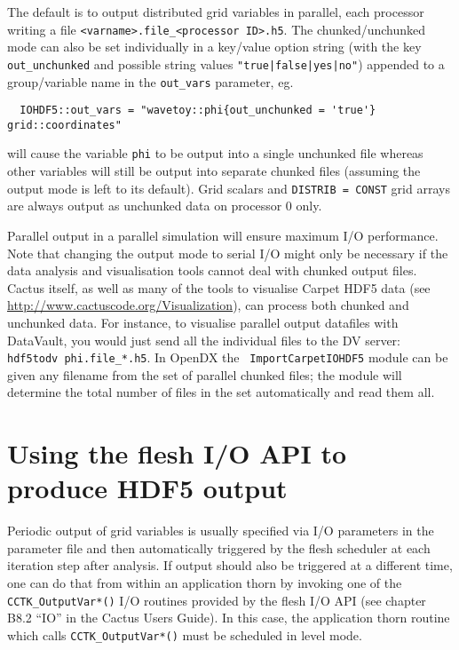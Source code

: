 \documentclass{article}
\begin{document}
The default is to output distributed grid variables in parallel, each processor
writing a file
{\tt \textless varname\textgreater.file\_\textless processor ID\textgreater.h5}.
The chunked/unchunked mode can also be set individually in a key/value
option string (with the key {\tt out\_unchunked} and possible string values
{\tt "true|false|yes|no"}) appended to a group/variable name in the
{\tt out\_vars} parameter, eg.
\begin{verbatim}
  IOHDF5::out_vars = "wavetoy::phi{out_unchunked = 'true'}  grid::coordinates"
\end{verbatim}
will cause the variable {\tt phi} to be output into a single unchunked file
whereas other variables will still be output into separate chunked files
(assuming the output mode is left to its default).
Grid scalars
and {\tt DISTRIB = CONST} grid arrays are always output as unchunked data
on processor 0 only.

Parallel output in a parallel simulation will ensure maximum I/O
performance. Note that changing the output mode to serial I/O might only be
necessary if the data analysis and visualisation tools cannot deal with
chunked output files. Cactus itself, as well as many of the tools to
visualise Carpet HDF5 data
(see \url{http://www.cactuscode.org/Visualization}),
can process both chunked and unchunked data. For instance, to visualise parallel
output datafiles with DataVault, you would just send all the individual files
to the DV server: {\tt hdf5todv phi.file\_*.h5}. In OpenDX the {\tt
ImportCarpetIOHDF5} module can be given any filename from the set of parallel
chunked files; the module will determine the total number of files in the set
automatically and read them all.


\section{Using the flesh I/O API to produce HDF5 output}

Periodic output of grid variables is usually specified via I/O parameters
in the parameter file and then automatically triggered by the flesh scheduler
at each iteration step after analysis. If output should also be triggered
at a different time, one can do that from within an application thorn by
invoking one of the {\tt CCTK\_OutputVar*()} I/O routines provided
by the flesh I/O API (see chapter B8.2 ``IO'' in the Cactus Users Guide).
In this case, the application thorn routine which calls {\tt CCTK\_OutputVar*()}
must be scheduled in level mode.
\end{document}
